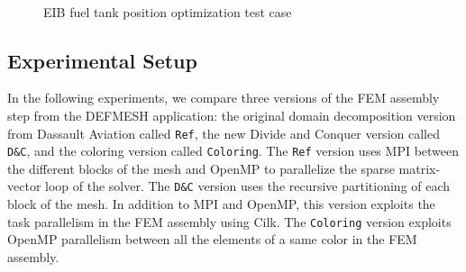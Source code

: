 \documentclass[10pt]{IOS-Book-Article}
\begin{document}
\begin{figure}[htp]
 \\
 \caption{EIB fuel tank position optimization test case}
 \label{fig:reservoir}
\end{figure}

\subsection{Experimental Setup}
In the following experiments, we compare three versions of the FEM assembly step from the DEFMESH application:
the original domain decomposition version from Dassault Aviation called {\tt Ref}, the new Divide and Conquer version called {\tt D\&C}, and the coloring version called {\tt Coloring}.
The {\tt Ref} version uses MPI between the different blocks of the mesh and OpenMP to parallelize the sparse matrix-vector loop of the solver.
The {\tt D\&C} version uses the recursive partitioning of each block of the mesh.
In addition to MPI and OpenMP, this version exploits the task parallelism in the FEM assembly using Cilk.
The {\tt Coloring} version exploits OpenMP parallelism between all the elements of a same color in the FEM assembly.
\end{document}
